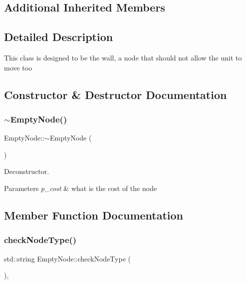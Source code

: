 \subsection*{Additional Inherited Members}


\subsection{Detailed Description}
This class is designed to be the wall, a node that should not allow the unit to move too 

\subsection{Constructor \& Destructor Documentation}
\mbox{\label{class_empty_node_aa8c8d6db9649c4ff5624be87953092d1}} 
\subsubsection{\texorpdfstring{$\sim$\+Empty\+Node()}{~EmptyNode()}}
{\footnotesize\ttfamily Empty\+Node\+::$\sim$\+Empty\+Node (\begin{DoxyParamCaption}{ }\end{DoxyParamCaption})}



Deconstructor. 


\begin{DoxyParams}{Parameters}
{\em p\+\_\+cost} & what is the cost of the node \\
\hline
\end{DoxyParams}


\subsection{Member Function Documentation}
\mbox{\label{class_empty_node_a2281f852354a5b95ba06f4e2a7e8de34}} 
\subsubsection{\texorpdfstring{check\+Node\+Type()}{checkNodeType()}}
{\footnotesize\ttfamily std\+::string Empty\+Node\+::check\+Node\+Type (\begin{DoxyParamCaption}{ }\end{DoxyParamCaption})\hspace{0.3cm}{\ttfamily [override]}, {\ttfamily [virtual]}}



